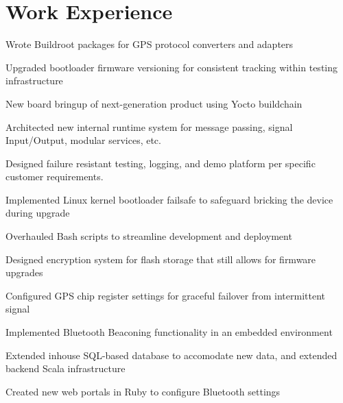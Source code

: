 \documentclass[]{resume}
\begin{document}
\begin{minipage}[t]{0.66\textwidth} 


\section{Work Experience}

\vspace{\topsep}
\begin{tightemize}
\item Wrote Buildroot packages for GPS protocol converters and adapters
\item Upgraded bootloader firmware versioning for consistent tracking within testing infrastructure
\item New board bringup of next-generation product using Yocto buildchain
\item Architected new internal runtime system for message passing, signal Input/Output, modular services, etc.
\item Designed failure resistant testing, logging, and demo platform per specific customer requirements.
\end{tightemize}
\sectionsep

\begin{tightemize}
\item Implemented Linux kernel bootloader failsafe to safeguard bricking the device during upgrade
\item Overhauled Bash scripts to streamline development and deployment
\item Designed encryption system for flash storage that still allows for firmware upgrades
\item Configured GPS chip register settings for graceful failover from intermittent signal
\end{tightemize}
\sectionsep

\begin{tightemize}
\item Implemented Bluetooth Beaconing functionality in an embedded environment
\item Extended inhouse SQL-based database to accomodate new data, and extended backend Scala infrastructure
\item Created new web portals in Ruby to configure Bluetooth settings
\end{tightemize}
\sectionsep


\end{minipage}
\end{document}
